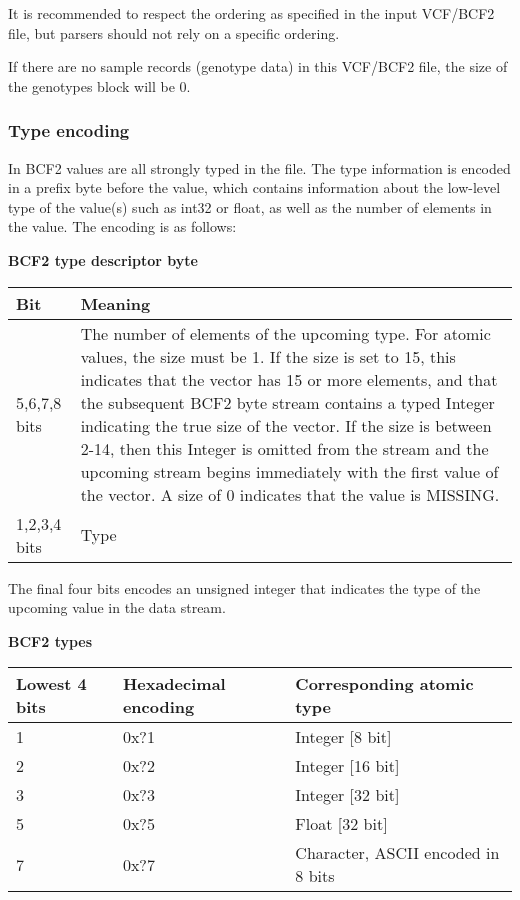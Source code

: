 \documentclass[8pt]{article}
\begin{document}
It is recommended to respect the ordering as specified in the input VCF/BCF2 file, but parsers should not rely on a specific ordering.

If there are no sample records (genotype data) in this VCF/BCF2 file, the size of the genotypes block will be 0.


\subsubsection{Type encoding}
\label{BcfTypeEncoding}

In BCF2 values are all strongly typed in the file.  The type information is encoded in a prefix byte before the value, which contains information about the low-level type of the value(s) such as int32 or float, as well as the number of elements in the value.  The encoding is as follows:

\vspace{0.3cm}
\textbf{BCF2 type descriptor byte}

\vspace{0.3cm}
\begin{tabular}{|p{2cm} | p{10cm}|} \hline
Bit & Meaning \\ \hline
5,6,7,8 bits & The number of elements of the upcoming type.  For atomic values, the size must be 1.  If the size is set to 15, this indicates that the vector has 15 or more elements, and that the subsequent BCF2 byte stream contains a typed Integer indicating the true size of the vector.  If the size is between 2-14, then this Integer is omitted from the stream and the upcoming stream begins immediately with the first value of the vector.  A size of 0 indicates that the value is MISSING. \\ \hline
1,2,3,4 bits & Type \\ \hline
\end{tabular}
\vspace{0.3cm}

The final four bits encodes an unsigned integer that indicates the type of the upcoming value in the data stream.

\textbf{BCF2 types}

\vspace{0.3cm}
\begin{tabular}{|l | l | l|} \hline
Lowest 4 bits & Hexadecimal encoding & Corresponding atomic type \\ \hline
1 & 0x?1 & Integer [8 bit] \\ \hline
2 & 0x?2 & Integer [16 bit] \\ \hline
3 & 0x?3 & Integer [32 bit] \\ \hline
5 & 0x?5 & Float [32 bit] \\ \hline
7 & 0x?7 & Character, ASCII encoded in 8 bits \\ \hline
\end{tabular}
\vspace{0.3cm}
\end{document}
